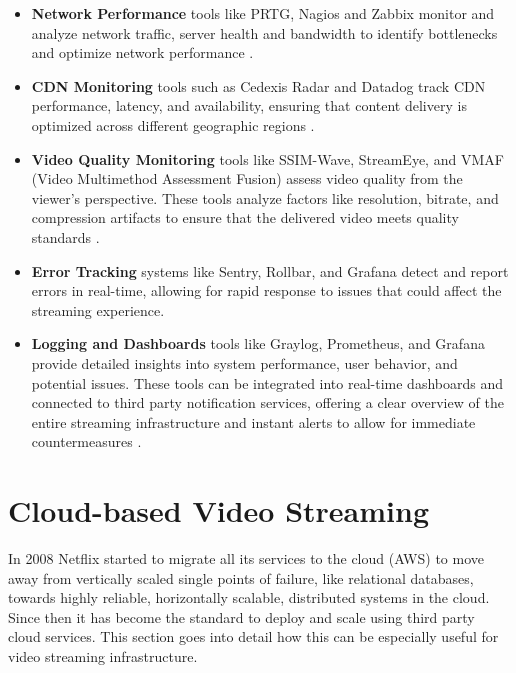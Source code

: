 \begin{itemize}
    \item \textbf{Network Performance} tools like PRTG, Nagios and Zabbix monitor and analyze network traffic, server health and bandwidth to identify bottlenecks and optimize network performance \cite{network_monitoring}.
    
    \item \textbf{CDN Monitoring} tools such as Cedexis Radar and Datadog track \ac{CDN} performance, latency, and availability, ensuring that content delivery is optimized across different geographic regions \cite{cdn_monitoring}.
    
    \item \textbf{Video Quality Monitoring} tools like SSIM-Wave, StreamEye, and VMAF (Video Multimethod Assessment Fusion) assess video quality from the viewer's perspective. These tools analyze factors like resolution, bitrate, and compression artifacts to ensure that the delivered video meets quality standards \cite{video_quality_monitoring}.
    
    \item \textbf{Error Tracking} systems like Sentry, Rollbar, and Grafana detect and report errors in real-time, allowing for rapid response to issues that could affect the streaming experience\cite{error_tracking}.
    
    \item \textbf{Logging and Dashboards} tools like Graylog, Prometheus, and Grafana provide detailed insights into system performance, user behavior, and potential issues. These tools can be integrated into real-time dashboards and connected to third party notification services, offering a clear overview of the entire streaming infrastructure and instant alerts to allow for immediate countermeasures \cite{logging_monitoring}.
\end{itemize}

\section{Cloud-based Video Streaming}

In 2008 Netflix started to migrate all its services to the cloud (\ac{AWS}) to move away from vertically scaled single points of failure, like relational databases, towards highly reliable, horizontally scalable, distributed systems in the cloud. Since then it has become the standard to deploy and scale using third party cloud services. This section goes into detail how this can be especially useful for video streaming infrastructure. 

